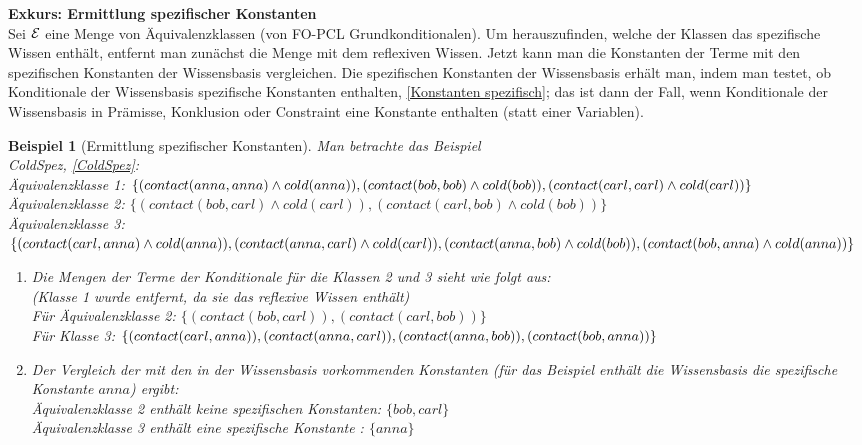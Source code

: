 \documentclass[a4paper, 11pt]{book}
\newtheorem{Bsp}{Beispiel}[section]
\begin{document}
\noindent
	\textbf{Exkurs: Ermittlung spezifischer Konstanten} \label{Ermittlung spezifischer Konstanten}  \\
Sei $ \cal E $ eine Menge von Äquivalenzklassen (von FO-PCL Grundkonditionalen). Um herauszufinden, welche der Klassen das  spezifische Wissen enthält, entfernt man zunächst die Menge mit dem reflexiven Wissen. Jetzt kann man die Konstanten der Terme mit den spezifischen Konstanten der Wissensbasis vergleichen. Die spezifischen Konstanten der Wissensbasis erhält man, indem man testet, ob Konditionale der Wissensbasis spezifische Konstanten enthalten, \ref{Konstanten spezifisch}; das ist dann der Fall, wenn Konditionale der Wissensbasis in Prämisse, Konklusion oder Constraint eine Konstante enthalten (statt einer Variablen).
\begin{Bsp}[Ermittlung spezifischer Konstanten]
	Man betrachte das Beispiel  \\ ColdSpez, \ref{ColdSpez}:\\ 
	Äquivalenzklasse 1: $ \{(contact(anna,anna) \land cold(anna)), (contact(bob,bob) \land cold(bob)),\\ (contact(carl,carl) \land cold(carl)) \} $\\
	Äquivalenzklasse 2: $ \{(contact(bob,carl) \land cold(carl)), (contact(carl,bob) \land cold(bob)) \} $\\
	Äquivalenzklasse 3: $ \{(contact(carl,anna) \land cold(anna)), (contact(anna, carl) \land cold(carl)),\\ (contact(anna,bob) \land cold(bob)), (contact(bob, anna) \land cold(anna)) \} $\\
	\begin{enumerate}
		\item Die Mengen der Terme der Konditionale für die Klassen 2 und 3 sieht wie folgt aus:\\
		(Klasse 1 wurde entfernt, da sie das reflexive Wissen enthält)\\
		Für Äquivalenzklasse 2: $ \{(contact(bob,carl)), (contact(carl,bob))\}$ \\
		Für Klasse 3: $ \{(contact(carl,anna)), (contact(anna, carl)), (contact(anna,bob)), \\(contact(bob, anna)) \}$ \\
		\item Der Vergleich der mit den in der Wissensbasis vorkommenden Konstanten (für das Beispiel enthält die Wissensbasis die spezifische Konstante $ anna $) ergibt:\\
		Äquivalenzklasse 2 enthält keine spezifischen Konstanten: $ \{bob, carl\}$ \\
		Äquivalenzklasse 3 enthält eine spezifische Konstante : $ \{anna\} $ 
	\end{enumerate}\
\end{Bsp}
\end{document}

